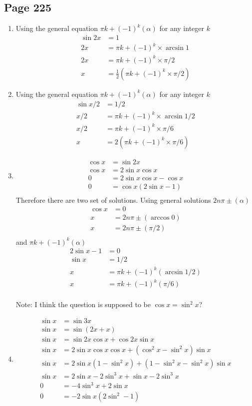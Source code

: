 \documentclass{article}
\newenvironment{solutions}[1]
{\subsection*{#1}
 \begin{enumerate}[leftmargin=1.5em]}
{\end{enumerate}}
\newcommand{\solution}{\item}
\begin{document}
\begin{solutions}{Page 225}
\solution
Using the general equation $\pi k + (-1)^k (\alpha)$ for any integer $k$
\begin{align*}
    \sin 2x &= 1\\
    2x &= \pi k + (-1)^k \times \arcsin 1\\
    2x &= \pi k + (-1)^k \times \pi/2\\
    x &= \frac{1}{2}\left(\pi k + (-1)^k \times \pi/2\right)
\end{align*}
\solution
Using the general equation $\pi k + (-1)^k (\alpha)$ for any integer $k$
\begin{align*}
    \sin x/2 &= 1/2\\
    x/2 &= \pi k + (-1)^k \times \arcsin 1/2\\
    x/2 &= \pi k + (-1)^k \times \pi/6\\
    x &= 2\left(\pi k + (-1)^k \times \pi/6\right)
\end{align*}
\solution
\begin{align*}
    \cos x &= \sin 2x\\
    \cos x &= 2\sin x \cos x\\
    0&= 2\sin x \cos x- \cos x\\
    0&= \cos x\left(2\sin x - 1\right)\\
\end{align*}
Therefore there are two set of solutions. Using general solutions $2n\pi \pm (\alpha)$ 
\begin{align*}
    \cos x &= 0\\
    x &= 2n\pi \pm (\arccos 0)\\
    x &= 2n\pi \pm (\pi/2)\\
\end{align*}
and $\pi k + (-1)^k (\alpha)$
\begin{align*}
    2\sin x -1 &= 0\\
    \sin x &= 1/2\\
    x &= \pi k + (-1)^k (\arcsin 1/2)\\
    x &= \pi k + (-1)^k (\pi/6)\\
\end{align*}

Note: I think the question is supposed to be $\cos x = \sin^2 x$?

\solution
\begin{align*}
    \sin x &= \sin 3x\\
    \sin x &= \sin (2x+x)\\
    \sin x &= \sin 2x \cos x + \cos 2x \sin x\\
    \sin x &= 2\sin x\cos x \cos x + (\cos^2 x - \sin^2 x)\sin x\\
    \sin x &= 2\sin x(1-\sin^2 x)+ (1-\sin^2 x -\sin^2 x)\sin x\\
    \sin x &= 2\sin x-2\sin^3 x+ \sin x-2\sin^3 x\\
    0 &= -4\sin^3 x + 2\sin x\\
    0 &= -2\sin x (2\sin^2-1)
\end{align*}


\end{solutions}
\end{document}

